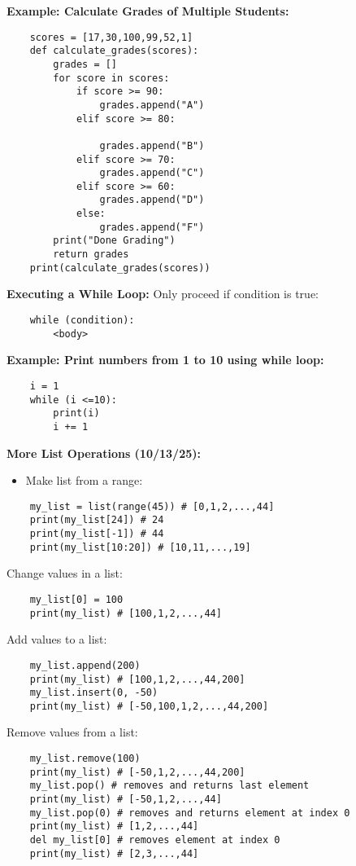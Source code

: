 \documentclass[11pt]{article}
\begin{document}
\textbf{Example: Calculate Grades of Multiple Students:}
\begin{verbatim}
    scores = [17,30,100,99,52,1]
    def calculate_grades(scores):
        grades = []
        for score in scores:
            if score >= 90:
                grades.append("A")
            elif score >= 80:

                grades.append("B")
            elif score >= 70:
                grades.append("C")
            elif score >= 60:
                grades.append("D")
            else:
                grades.append("F")
        print("Done Grading")
        return grades
    print(calculate_grades(scores))
\end{verbatim}
\textbf{Executing a While Loop:}
Only proceed if condition is true:
\begin{verbatim}
    while (condition):
        <body>
\end{verbatim}
\textbf{Example: Print numbers from 1 to 10 using while loop:}
\begin{verbatim}
    i = 1
    while (i <=10):
        print(i)
        i += 1
\end{verbatim}
\textbf{More List Operations (10/13/25):}
\begin{itemize}
    \item Make list from a range:
\end{itemize}
\begin{verbatim}
    my_list = list(range(45)) # [0,1,2,...,44]
    print(my_list[24]) # 24
    print(my_list[-1]) # 44
    print(my_list[10:20]) # [10,11,...,19]
\end{verbatim}
Change values in a list:
\begin{verbatim}
    my_list[0] = 100
    print(my_list) # [100,1,2,...,44]
\end{verbatim}
Add values to a list:
\begin{verbatim}
    my_list.append(200)
    print(my_list) # [100,1,2,...,44,200]
    my_list.insert(0, -50) 
    print(my_list) # [-50,100,1,2,...,44,200]
\end{verbatim}
Remove values from a list:
\begin{verbatim}
    my_list.remove(100)
    print(my_list) # [-50,1,2,...,44,200]
    my_list.pop() # removes and returns last element
    print(my_list) # [-50,1,2,...,44]
    my_list.pop(0) # removes and returns element at index 0
    print(my_list) # [1,2,...,44]
    del my_list[0] # removes element at index 0
    print(my_list) # [2,3,...,44]
\end{verbatim}
\end{document}
